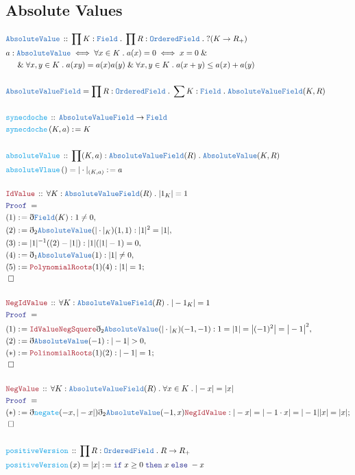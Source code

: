 \documentclass[12pt]{scrartcl}
\newcommand{\TYPE}[1]{\textcolor{NavyBlue}{\mathtt{#1}}}
\newcommand{\FUNC}[1]{\textcolor{Cerulean}{\mathtt{#1}}}
\newcommand{\LOGIC}[1]{\textcolor{Blue}{\mathtt{#1}}}
\newcommand{\THM}[1]{\textcolor{Maroon}{\mathtt{#1}}}
\renewcommand{\.}{\; . \;}
\newcommand{\de}{: \kern 0.1pc =}
\newcommand{\If}{\LOGIC{if} \;}
\newcommand{\Then}{ \; \LOGIC{then} \;}
\newcommand{\Else}{\; \LOGIC{else} \;}
\newcommand{\Act}[1]{\left( #1 \right)}
\newcommand{\Theorem}[2]{& \THM{#1} \, :: \, #2 \\ & \Proof = \\ }
\newcommand{\DeclareType}[2]{& \TYPE{#1} \, :: \, #2 \\}
\newcommand{\DefineType}[3]{& #1 : \TYPE{#2} \iff #3 \\}
\newcommand{\DeclareFunc}[2]{& \FUNC{#1} \, :: \, #2 \\}
\newcommand{\DefineFunc}[3]{&  \FUNC{#1}\Act{#2} \de #3 \\}
\newcommand{\DefineNamedFunc}[4]{&  \FUNC{#1}\Act{#2} = #3 \de #4 \\}
\newcommand{\NewLine}{\\ & \kern 1pc}
\newcommand{\Page}[1]{ \begin{align*} #1 \end{align*}   }
\newcommand{ \bd }{ \ByDef }
\renewcommand{\And}{\; \& \;}
\newcommand{\Say}[3]{& #1 \de #2 : #3, \\}
\newcommand{\Conclude}[3]{& #1 \de #2 : #3; \\}
\newcommand{\QED}{\; \square}
\newcommand{\EndProof}{& \QED \\}
\newcommand{\ByDef}{\eth}
\newcommand{\Proof}{\LOGIC{Proof} \; }
\newcommand{\OF}{\TYPE{OrderedField}}
\begin{document}
\subsection{Absolute Values}
\Page{
	\DeclareType{AbsoluteValue}{ \prod K : \TYPE{Field} \. \prod R : \OF \. ?(K \to R_+) }
	\DefineType{a}{AbsoluteValue}{ \forall x \in K \.  a(x) = 0 \iff x = 0
		\And  \NewLine \And \forall x,y \in K \. a(xy) = a(x)a(y)
		\And \forall x,y \in K \. a(x + y) \le a(x) + a(y)
	}
\\
& \TYPE{AbsoluteValueField} = \prod R : \OF \. \sum K : \TYPE{Field} \. \TYPE{AbsoluteValueField}(K,R) \\
\\
\DeclareFunc{synecdoche}{ \TYPE{AbsoluteValueField} \to \TYPE{Field} }
\DefineFunc{synecdoche}{K,a}{K}
\\
\DeclareFunc{absoluteValue}{ \prod (K,a) : \TYPE{AbsoluteValueField}(R) \. \TYPE{AbsoluteValue}(K,R)}
\DefineNamedFunc{absoluteVlaue}{ }{|\cdot|_{(K,a)}}{a}
\\
\Theorem{IdValue}{\forall K : \TYPE{AbsoluteValueField}(R) \. |1_K| = 1}
\Say{(1)}{\bd \TYPE{Field}(K)}{1 \neq 0}
\Say{(2)}{\bd_2 \TYPE{AbsoluteValue}(|\cdot|_K)(1,1)}{|1|^2 = |1|}
\Say{(3)}{ |1|^{-1}((2) - |1|)  }{|1|(|1| - 1) = 0}
\Say{(4)}{\bd_1 \TYPE{AbsoluteValue}(1)}{ |1| \neq 0 }
\Conclude{(5)}{\THM{PolynomialRoots}(1)(4)}{|1| = 1}
\EndProof
\\
\Theorem{NegIdValue}{\forall K : \TYPE{AbsoluteValueField}(R) \. |-1_K| = 1}
\Say{(1)}{ \THM{IdValue}\THM{NegSquere}\bd_2 \TYPE{AbsoluteValue}(|\cdot|_K)(-1,-1)  }
{ 1 = | 1 | = \big| (-1)^2 \big| =  \big| -1 \big|^2   }
\Say{(2)}{\bd \TYPE{AbsoluteValue}(-1)}{ |-1| > 0 }
\Conclude{(*)}{\THM{PolinomialRoots}(1)(2)}{|-1| = 1}
\EndProof
\\
\Theorem{NegValue}{\forall K : \TYPE{AbsoluteValueField}(R) \. \forall x \in K \. |-x| = |x|}
\Conclude{(*)}{ \bd \FUNC{negate}(-x,|-x|) \bd_2 \TYPE{AbsoluteValue}(-1,x)  \THM{NegIdValue}}{ |-x| = |-1\cdot x| = |-1||x| = |x| }
\EndProof
\\
\DeclareFunc{positiveVersion}{ \prod R : \OF \. R \to R_+ }
\DefineNamedFunc{positiveVersion}{x}{|x|}{ \If x \ge 0 \Then x \Else -x  }
}
\end{document}
